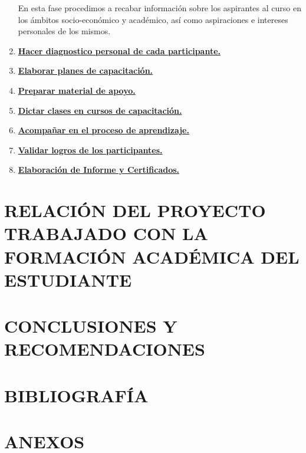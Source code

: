 \documentclass[letterpaper,12pt]{article}
\begin{document}
\begin{enumerate}
             En esta fase procedimos a recabar información sobre los aspirantes al curso en los ámbitos socio-económico y académico, así como aspiraciones e intereses personales de los mismos.
             
             \item \underline{\textbf{Hacer diagnostico personal de cada participante.}}
             \item \underline{\textbf{Elaborar planes de capacitación.}}
             \item \underline{\textbf{Preparar material de apoyo.}}
             \item \underline{\textbf{Dictar clases en cursos de capacitación.}}
             \item \underline{\textbf{Acompañar en el proceso de aprendizaje.}}
             \item \underline{\textbf{Validar logros de los participantes.}}
             \item \underline{\textbf{Elaboración de Informe y Certificados.}}
            \end{enumerate}
	\pagebreak
	
	\section{RELACIÓN DEL PROYECTO TRABAJADO CON LA FORMACIÓN ACADÉMICA	DEL ESTUDIANTE}
	\pagebreak
	
	\section{CONCLUSIONES Y RECOMENDACIONES}
	\pagebreak
	
	\section{BIBLIOGRAFÍA}
	\pagebreak
	
	\section{ANEXOS}
\end{document}
